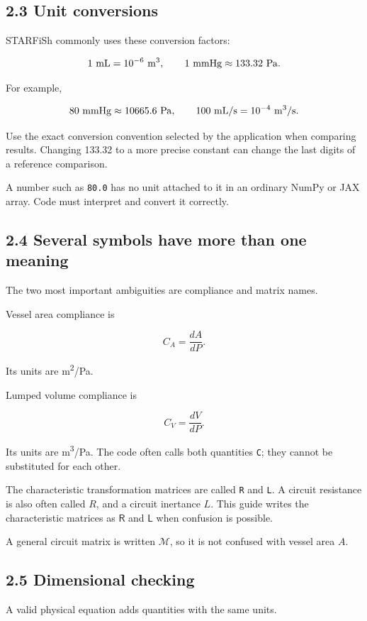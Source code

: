 \documentclass[11pt,a4paper]{article}
\begin{document}
\subsection{2.3 Unit conversions}
STARFiSh commonly uses these conversion factors:


\begingroup\small
\[
1\ {\rm mL}=10^{-6}\ {\rm m}^3,
\qquad
1\ {\rm mmHg}\approx133.32\ {\rm Pa}.
\]
\endgroup


For example,


\begingroup\small
\[
80\ {\rm mmHg}\approx10665.6\ {\rm Pa},
\qquad
100\ {\rm mL/s}=10^{-4}\ {\rm m}^3/{\rm s}.
\]
\endgroup


Use the exact conversion convention selected by the application when comparing results. Changing 133.32 to a more precise constant can change the last digits of a reference comparison.

A number such as \texttt{80.\allowbreak{}0} has no unit attached to it in an ordinary NumPy or JAX array. Code must interpret and convert it correctly.

\subsection{2.4 Several symbols have more than one meaning}
The two most important ambiguities are compliance and matrix names.

Vessel area compliance is


\begingroup\small
\[
C_A=\frac{dA}{dP}.
\]
\endgroup


Its units are m\textsuperscript{2}/Pa.

Lumped volume compliance is


\begingroup\small
\[
C_V=\frac{dV}{dP}.
\]
\endgroup


Its units are m\textsuperscript{3}/Pa. The code often calls both quantities \texttt{C}; they cannot be substituted for each other.

The characteristic transformation matrices are called \texttt{R} and \texttt{L}. A circuit resistance is also often called \(R\), and a circuit inertance \(L\). This guide writes the characteristic matrices as \(\mathsf R\) and \(\mathsf L\) when confusion is possible.

A general circuit matrix is written \(\mathcal M\), so it is not confused with vessel area \(A\).

\subsection{2.5 Dimensional checking}
A valid physical equation adds quantities with the same units.
\end{document}

